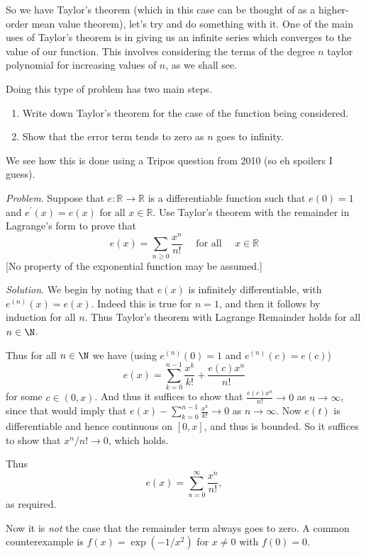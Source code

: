 So we have Taylor's theorem (which in this case can be thought of as a higher-order mean value theorem), let's try and do something with it. One of the main uses of Taylor's theorem is in giving us an infinite series which converges to the value of our function. This involves considering the terms of the degree $n$ taylor polynomial for increasing values of $n$, as we shall see.

Doing this type of problem has two main steps.
\begin{enumerate}
	\item Write down Taylor's theorem for the case of the function being considered.
	\item Show that the error term tends to zero as $n$ goes to infinity.
\end{enumerate}
We see how this is done using a Tripos question from 2010 (so eh spoilers I guess).

\begin{example}
\emph{Problem}. Suppose that $e: \mathbb{R} \rightarrow \mathbb{R}$ is a differentiable function such that $e(0)=1$ and $e^{\prime}(x)=e(x)$ for all $x \in \mathbb{R}$. Use Taylor's theorem with the remainder in Lagrange's form to prove that
$$
e(x)=\sum_{n \geqslant 0} \frac{x^{n}}{n !} \quad \text { for all } \quad x \in \mathbb{R}
$$
[No property of the exponential function may be assumed.]

\emph{Solution}. We begin by noting that $e(x)$ is infinitely differentiable, with $e^{(n)}(x) = e(x)$. Indeed this is true for $n = 1$, and then it follows by induction for all $n$. Thus Taylor's theorem with Lagrange Remainder holds for all $n \in \N$.

Thus for all $n \in \N$ we have (using $e^{(n)}(0) = 1$ and $e^{(n)}(c) = e(c)$)
$$
e(x) = \sum_{k = 0}^{n - 1}\frac{x^k}{k!} + \frac{e(c) x^n}{n!} 
$$
for some $c \in (0, x)$.
And thus it suffices to show that $\frac{e(c)x^n}{n!} \rightarrow 0$ as $n \rightarrow \infty$, since that would imply that $e(x) - \sum_{k = 0}^{n - 1} \frac{x^k}{k!} \rightarrow 0$ as $n \rightarrow \infty$.
Now $e(t)$ is differentiable and hence continuous on $[0, x]$, and thus is bounded. So it suffices to show that $x^n/n! \rightarrow 0$, which holds.

Thus
$$
e(x) = \sum_{n = 0}^{\infty} \frac{x^n}{n!},
$$
as required.
\end{example}


Now it is \emph{not} the case that the remainder term always goes to zero. A common counterexample is $f(x) = \exp(-1/x^2)$ for $x \neq 0$ with $f(0) = 0$.

